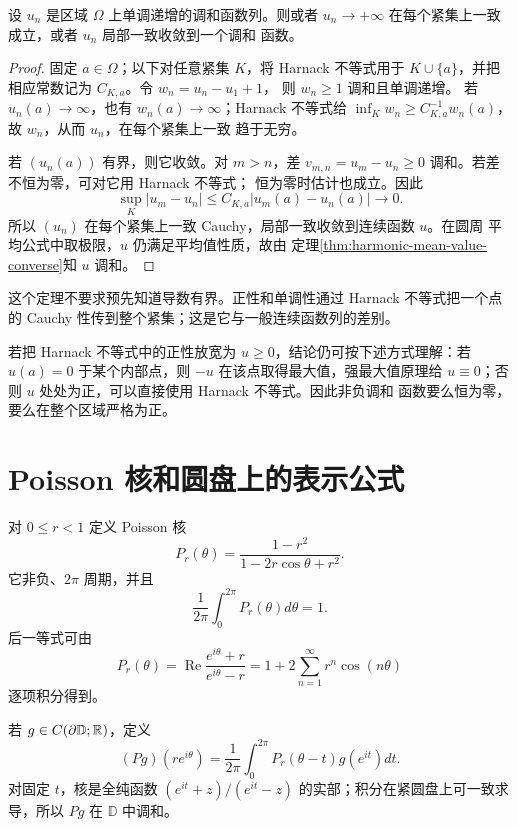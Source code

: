 \begin{theorem}\label{thm:harnack-convergence}
设 $u_n$ 是区域 $\Omega$ 上单调递增的调和函数列。则或者
$u_n\to+\infty$ 在每个紧集上一致成立，或者 $u_n$ 局部一致收敛到一个调和
函数。
\end{theorem}

\begin{proof}
固定 $a\in\Omega$；以下对任意紧集 $K$，将 Harnack 不等式用于
$K\cup\{a\}$，并把相应常数记为 $C_{K,a}$。令 $w_n=u_n-u_1+1$，
则 $w_n\ge1$ 调和且单调递增。
若 $u_n(a)\to\infty$，也有 $w_n(a)\to\infty$；Harnack 不等式给
$\inf_Kw_n\ge C_{K,a}^{-1}w_n(a)$，故 $w_n$，从而 $u_n$，在每个紧集上一致
趋于无穷。

若 $(u_n(a))$ 有界，则它收敛。对 $m>n$，差
$v_{m,n}=u_m-u_n\ge0$ 调和。若差不恒为零，可对它用 Harnack 不等式；
恒为零时估计也成立。因此
\[
 \sup_K|u_m-u_n|\le C_{K,a}|u_m(a)-u_n(a)|\longrightarrow0.
\]
所以 $(u_n)$ 在每个紧集上一致 Cauchy，局部一致收敛到连续函数 $u$。在圆周
平均公式中取极限，$u$ 仍满足平均值性质，故由
定理\ref{thm:harmonic-mean-value-converse}知 $u$ 调和。
\end{proof}

这个定理不要求预先知道导数有界。正性和单调性通过 Harnack 不等式把一个点
的 Cauchy 性传到整个紧集；这是它与一般连续函数列的差别。

若把 Harnack 不等式中的正性放宽为 $u\ge0$，结论仍可按下述方式理解：若
$u(a)=0$ 于某个内部点，则 $-u$ 在该点取得最大值，强最大值原理给
$u\equiv0$；否则 $u$ 处处为正，可以直接使用 Harnack 不等式。因此非负调和
函数要么恒为零，要么在整个区域严格为正。

\section{Poisson 核和圆盘上的表示公式}

对 $0\le r<1$ 定义 Poisson 核
\begin{equation}\label{eq:poisson-kernel-circle}
 P_r(\theta)=\frac{1-r^2}{1-2r\cos\theta+r^2}.
\end{equation}
它非负、$2\pi$ 周期，并且
\[
 \frac1{2\pi}\int_0^{2\pi}P_r(\theta)d\theta=1.
\]
后一等式可由
\[
 P_r(\theta)=\operatorname{Re}\frac{e^{i\theta}+r}{e^{i\theta}-r}
 =1+2\sum_{n=1}^{\infty}r^n\cos(n\theta)
\]
逐项积分得到。

若 $g\in C(\partial\mathbb D;\mathbb{R})$，定义
\begin{equation}\label{eq:poisson-integral}
 (Pg)(re^{i\theta})=\frac1{2\pi}\int_0^{2\pi}
 P_r(\theta-t)g(e^{it})dt.
\end{equation}
对固定 $t$，核是全纯函数
$(e^{it}+z)/(e^{it}-z)$ 的实部；积分在紧圆盘上可一致求导，所以 $Pg$ 在
$\mathbb D$ 中调和。

